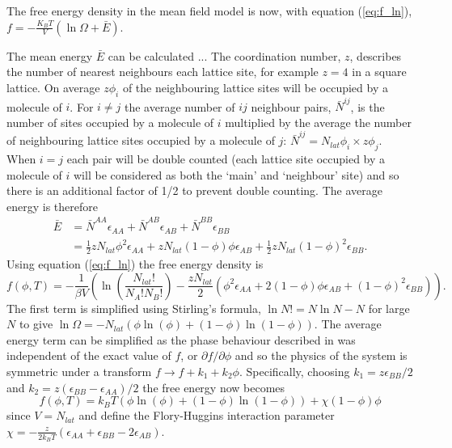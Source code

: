 The free energy density in the mean field model is now, with equation (\ref{eq:f_ln}), $f = -\frac{K_B T}{V} (\ln \Omega + \bar{E})$.

The mean energy $\bar{E}$ can be calculated ... The coordination number, $z$, describes the number of nearest neighbours each lattice site, for example $z=4$ in a square lattice. On average $z\phi_i$ of the neighbouring lattice sites will be occupied by a molecule of $i$. For $i \neq j$ the average number of $ij$ neighbour pairs, $\bar{N}^{ij}$, is the number of sites occupied by a molecule of $i$ multiplied by the average the number of neighbouring lattice sites occupied by a molecule of $j$: $\bar{N}^{ij} = N_{lat}\phi_i \times z\phi_j$. When $i=j$ each pair will be double counted (each lattice site occupied by a molecule of $i$ will be considered as both the `main' and `neighbour' site) and so there is an additional factor of 1/2 to prevent double counting. The average energy is therefore
\begin{equation}
\begin{split}
    \bar{E} &= \bar{N}^{AA}\epsilon_{AA} + \bar{N}^
    {AB}\epsilon_{AB} + \bar{N}^{BB}\epsilon_{BB}\\
    &= \frac{1}{2}z N_{lat} \phi^2\epsilon_{AA} + z N_{lat} (1-\phi)\phi\epsilon_{AB} + \frac{1}{2}z N_{lat} (1-\phi)^2 \epsilon_{BB}.
\end{split}
\end{equation}
Using equation (\ref{eq:f_ln}) the free energy density is
\begin{equation}
    f(\phi, T) = -\frac{1}{\beta V}\left(\ln \left(\frac{N_{lat}!}{N_A! N_B!} \right) - \frac{z N_{lat}}{2} \left(\phi^2\epsilon_{AA} + 2(1-\phi)\phi\epsilon_{AB} + (1-\phi)^2 \epsilon_{BB}\right)\right).
\end{equation}
The first term is simplified using Stirling's formula, $\ln N! = N \ln N - N$ for large $N$ to give $\ln\Omega=-N_{lat}(\phi\ln(\phi)+(1-\phi)\ln(1-\phi))$. The average energy term can be simplified as the phase behaviour described in  was independent of the exact value of $f$, or $\partial f/\partial \phi$ and so the physics of the system is symmetric under a transform $f \rightarrow f + k_1 + k_2\phi$. Specifically, choosing $k_1 = z\epsilon_{BB}/2$ and $k_2 = z(\epsilon_{BB} - \epsilon_{AA})/2$ the free energy now becomes
\begin{equation}
    f(\phi, T) = k_B T (\phi\ln(\phi)+(1-\phi)\ln(1-\phi)) + \chi(1-\phi)\phi
\end{equation}
since $V = N_{lat}$ and define the Flory-Huggins interaction parameter $\chi = -\frac{z}{2 k_B T}(\epsilon_{AA}+\epsilon_{BB}-2\epsilon_{AB})$. 

